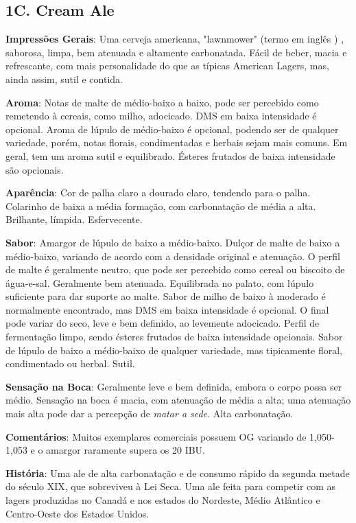 \subsection*{1C. Cream Ale}
\textbf{Impressões Gerais}: Uma cerveja americana, "lawnmower" (termo em inglês ) , saborosa, limpa, bem atenuada e altamente carbonatada. Fácil de beber, macia e refrescante, com mais personalidade do que as típicas American Lagers, mas, ainda assim, sutil e contida.

\textbf{Aroma}: Notas de malte de médio-baixo a baixo, pode ser percebido como remetendo à cereais, como milho, adocicado. DMS em baixa intensidade é opcional. Aroma de lúpulo de médio-baixo é opcional, podendo ser de qualquer variedade, porém, notas florais, condimentadas e herbais sejam mais comuns. Em geral, tem um aroma sutil e equilibrado. Ésteres frutados de baixa intensidade são opcionais.

\textbf{Aparência}: Cor de palha claro a dourado claro, tendendo para o palha. Colarinho de baixa a média formação, com carbonatação de média a alta. Brilhante, límpida. Esfervecente.

\textbf{Sabor}: Amargor de lúpulo de baixo a médio-baixo. Dulçor de malte de baixo a médio-baixo, variando de acordo com a densidade original e atenuação. O perfil de malte é geralmente neutro, que pode ser percebido como cereal ou biscoito de água-e-sal. Geralmente bem atenuada. Equilibrada no palato, com lúpulo suficiente para dar suporte ao malte. Sabor de milho de baixo à moderado é normalmente encontrado, mas DMS em baixa intensidade é opcional. O final pode variar do seco, leve e bem definido, ao levemente adocicado. Perfil de fermentação limpo, sendo ésteres frutados de baixa intensidade opcionais. Sabor de lúpulo de baixo a médio-baixo de qualquer variedade, mas tipicamente floral, condimentado ou herbal. Sutil.

\textbf{Sensação na Boca}: Geralmente leve e bem definida, embora o corpo possa ser médio. Sensação na boca é macia, com atenuação de média a alta; uma atenuação mais alta pode dar a percepção de \textit{matar a sede}. Alta carbonatação.

\textbf{Comentários}: Muitos exemplares comerciais possuem OG variando de 1,050-1,053 e o amargor raramente supera os 20 IBU.

\textbf{História}: Uma ale de alta carbonatação e de consumo rápido da segunda metade do século XIX, que sobreviveu à Lei Seca. Uma ale feita para competir com as lagers produzidas no Canadá e nos estados do Nordeste, Médio Atlântico e Centro-Oeste dos Estados Unidos.


